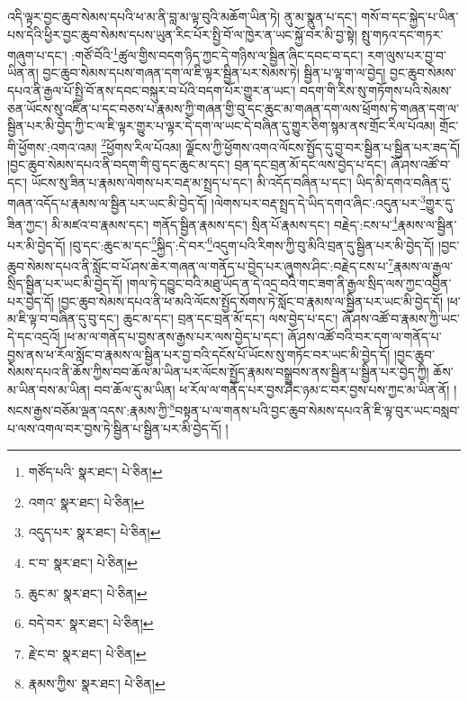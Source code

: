 འདི་ལྟར་བྱང་ཆུབ་སེམས་དཔའི་ཕ་མ་ནི་བླ་མ་ལྟ་བུའི་མཆོག་ཡིན་ཏེ། ནུ་མ་སྣུན་པ་དང་། གསོ་བ་དང་སྐྱེད་པ་ཡིན་པས་དེའི་ཕྱིར་བྱང་ཆུབ་སེམས་དཔས་ཡུན་རིང་པོར་སྤྱི་བོ་ལ་ཁྱེར་ན་ཡང་སྐྱོ་བར་མི་བྱ་སྟེ། སྤུ་གཏའ་དང་གཏར་གཞུག་པ་དང་། :གཙོ་བོའི་\footnote{གཙོད་པའི་  སྣར་ཐང་།  པེ་ཅིན། }ཚུལ་གྱིས་བདག་ཉིད་ཀྱང་དེ་གཉིས་ལ་སྦྱིན་ཞིང་དབང་བ་དང་། རག་ལུས་པར་བྱ་བ་ཡིན་ན། བྱང་ཆུབ་སེམས་དཔས་གཞན་དག་ལ་ཇི་ལྟར་སྦྱིན་པར་སེམས་ཏེ། སྦྱིན་པ་ལྟ་ག་ལ་བྱེད། བྱང་ཆུབ་སེམས་དཔའ་ནི་རྒྱལ་པོ་སྤྱི་བོ་ནས་དབང་བསྐུར་བ་པོའི་བདག་པོར་གྱུར་ན་ཡང་། བདག་གི་རིས་སུ་གཏོགས་པའི་སེམས་ཅན་ཡོངས་སུ་འཛིན་པ་དང་བཅས་པ་རྣམས་ཀྱི་གཞན་གྱི་བུ་དང་ཆུང་མ་གཞན་དག་ལས་ཕྲོགས་ཏེ་གཞན་དག་ལ་སྦྱིན་པར་མི་བྱེད་ཀྱི་ང་ལ་ཇི་ལྟར་གྱུར་པ་ལྟར་དེ་དག་ལ་ཡང་དེ་བཞིན་དུ་གྱུར་ཅིག་སྙམ་ནས་གྲོང་རིལ་པོའམ། གྲོང་གི་ཕྱོགས་:འགའ་འམ། \footnote{འགའ་  སྣར་ཐང་།  པེ་ཅིན། }ཕྱོགས་རིལ་པོའམ། ལྗོངས་ཀྱི་ཕྱོགས་འགའ་ལོངས་སྤྱོད་དུ་བྱ་བར་སྦྱིན་པ་སྦྱིན་པར་ཟད་དོ། །བྱང་ཆུབ་སེམས་དཔའ་ནི་བདག་གི་བུ་དང་ཆུང་མ་དང་། བྲན་དང་བྲན་མོ་དང་ལས་བྱེད་པ་དང་། ཞོ་ཤས་འཚོ་བ་དང་། ཡོངས་སུ་ཟིན་པ་རྣམས་ལེགས་པར་བརྡ་མ་སྤྲད་པ་དང་། མི་འདོད་བཞིན་པ་དང་། ཡིད་མི་དགའ་བཞིན་དུ་གཞན་འདོད་པ་རྣམས་ལ་སྦྱིན་པར་ཡང་མི་བྱེད་དོ། །ལེགས་པར་བརྡ་སྤྲད་དེ་ཡིད་དགའ་ཞིང་:འདུན་པར་\footnote{འདུད་པར་  སྣར་ཐང་།  པེ་ཅིན། }གྱུར་དུ་ཟིན་ཀྱང་། མི་མཛའ་བ་རྣམས་དང་། གནོད་སྦྱིན་རྣམས་དང་། སྲིན་པོ་རྣམས་དང་། བརྗེད་:ངས་པ་\footnote{ང་བ་  སྣར་ཐང་།  པེ་ཅིན། }རྣམས་ལ་སྦྱིན་པར་མི་བྱེད་དོ། །བུ་དང་:ཆུང་མ་དང་\footnote{ཆུང་མ་  སྣར་ཐང་།  པེ་ཅིན། }སྐྱིད་:དེ་བར་\footnote{བདེ་བར་  སྣར་ཐང་།  པེ་ཅིན། }འདུག་པའི་རིགས་ཀྱི་བུ་མིའི་བྲན་དུ་སྦྱིན་པར་མི་བྱེད་དོ། །བྱང་ཆུབ་སེམས་དཔའ་ནི་སློང་བ་པོ་ཤས་ཆེར་གཞན་ལ་གནོད་པ་བྱེད་པར་ཞུགས་ཤིང་:བརྗེད་ངས་པ་\footnote{རྗེ་ང་བ་  སྣར་ཐང་།  པེ་ཅིན། }རྣམས་ལ་རྒྱལ་སྲིད་སྦྱིན་པར་ཡང་མི་བྱེད་དོ། །གལ་ཏེ་དབྱུང་བའི་མཐུ་ཡོད་ན་དེ་འདྲ་བའི་གང་ཟག་ནི་རྒྱལ་སྲིད་ལས་ཀྱང་འབྱིན་པར་བྱེད་དོ། །བྱང་ཆུབ་སེམས་དཔའ་ནི་ཕ་མའི་ལོངས་སྤྱོད་སོགས་ཏེ་སློང་བ་རྣམས་ལ་སྦྱིན་པར་ཡང་མི་བྱེད་དོ། །ཕ་མ་ཇི་ལྟ་བ་བཞིན་དུ་བུ་དང་། ཆུང་མ་དང་། བྲན་དང་བྲན་མོ་དང་། ལས་བྱེད་པ་དང་། ཞོ་ཤས་འཚོ་བ་རྣམས་ཀྱི་ཡང་དེ་དང་འདྲའོ། །ཕ་མ་ལ་གནོད་པ་བྱས་ནས་རྒྱས་པར་ལས་བྱེད་པ་དང་། ཞོ་ཤས་འཚོ་བའི་བར་དག་ལ་གནོད་པ་བྱས་ནས་ཕ་རོལ་སློང་བ་རྣམས་ལ་སྦྱིན་པར་བྱ་བའི་དངོས་པོ་ཡོངས་སུ་གཏོང་བར་ཡང་མི་བྱེད་དོ། །བྱང་ཆུབ་སེམས་དཔའ་ནི་ཆོས་ཀྱིས་བབ་ཆོལ་མ་ཡིན་པར་ལོངས་སྤྱོད་རྣམས་བསྒྲུབས་ནས་སྦྱིན་པ་སྦྱིན་པར་བྱེད་ཀྱི། ཆོས་མ་ཡིན་བས་མ་ཡིན། བབ་ཆོལ་དུ་མ་ཡིན། ཕ་རོལ་ལ་གནོད་པར་བྱས་ཤིང་ཉམ་ང་བར་བྱས་པས་ཀྱང་མ་ཡིན་ནོ། །སངས་རྒྱས་བཅོམ་ལྡན་འདས་:རྣམས་ཀྱི་\footnote{རྣམས་ཀྱིས་  སྣར་ཐང་།  པེ་ཅིན། }བསྟན་པ་ལ་གནས་པའི་བྱང་ཆུབ་སེམས་དཔའ་ནི་ཇི་ལྟ་བུར་ཡང་བསླབ་པ་ལས་འགལ་བར་བྱས་ཏེ་སྦྱིན་པ་སྦྱིན་པར་མི་བྱེད་དོ། །
